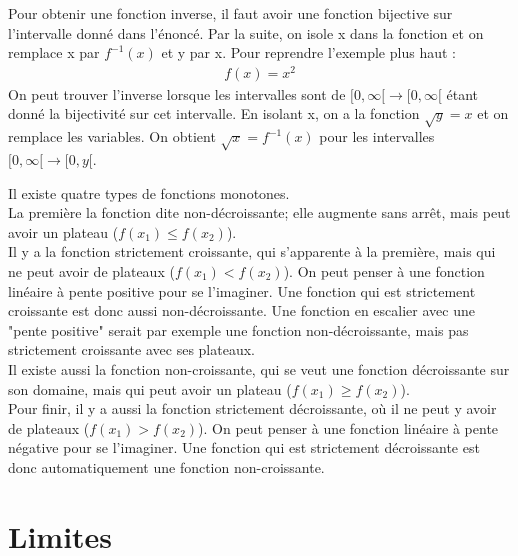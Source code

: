 \documentclass[10pt, french]{article}
\begin{document}
\begin{multicols*}{2}
\begin{definitionNOHFILL}
Pour obtenir une fonction inverse, il faut avoir une fonction bijective sur l'intervalle donné dans l'énoncé. Par la suite, on isole x dans la fonction et on remplace x par $f^{-1}(x)$ et y par x. Pour reprendre l'exemple plus haut :
  \begin{align*}
  f(x) = x^{2}
  \end{align*}
On peut trouver l'inverse lorsque les intervalles sont de $[ 0, \infty [ \rightarrow [ 0, \infty [$ étant donné la bijectivité sur cet intervalle. En isolant x, on a la fonction $\sqrt{y} = x$ et on remplace les variables. On obtient $\sqrt{x} = f^{-1}(x)$ pour les intervalles $[ 0, \infty [ \rightarrow [ 0, y [$. 
\end{definitionNOHFILL}

\begin{definitionNOHFILL}
Il existe quatre types de fonctions monotones. \\
La première la fonction dite non-décroissante; elle augmente sans arrêt, mais peut avoir un plateau ($f(x_{1}) \leq f(x_{2})$). \\
Il y a la fonction strictement croissante, qui s'apparente à la première, mais qui ne peut avoir de plateaux ($f(x_{1}) < f(x_{2})$). On peut penser à une fonction linéaire à pente positive pour se l'imaginer. Une fonction qui est strictement croissante est donc aussi non-décroissante. Une fonction en escalier avec une "pente positive" serait par exemple une fonction non-décroissante, mais pas strictement croissante avec ses plateaux.\\
Il existe aussi la fonction non-croissante, qui se veut une fonction décroissante sur son domaine, mais qui peut avoir un plateau ($f(x_{1}) \geq f(x_{2})$). \\
Pour finir, il y a aussi la fonction strictement décroissante, où il ne peut y avoir de plateaux ($f(x_{1}) > f(x_{2})$). On peut penser à une fonction linéaire à pente négative pour se l'imaginer. Une fonction qui est strictement décroissante est donc automatiquement une fonction non-croissante.
\end{definitionNOHFILL}

\section{Limites}


\end{multicols*}
\end{document}
